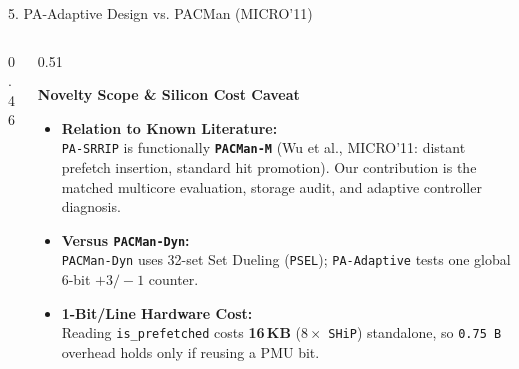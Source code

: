 \documentclass[aspectratio=169, 10pt]{beamer}
\begin{document}
\begin{frame}{5. PA-Adaptive Design vs. PACMan (MICRO'11)}
\begin{columns}[onlytextwidth]
\begin{column}{0.46\textwidth}
\begin{tcolorbox}[cleanpanel, top=1.2mm, bottom=1.2mm, left=1.0mm, right=1.0mm]
{%
        }
      \end{tcolorbox}
    \end{column}%
    \hfill%
    \begin{column}{0.51\textwidth}
      \begin{tcolorbox}[archpanel]
        {\small\textbf{\color{Obsidian}Novelty Scope \& Silicon Cost Caveat}}\par\vspace{0.06cm}
        \begin{itemize}\setlength{\itemsep}{0.16em}\footnotesize
          \item \textbf{Relation to Known Literature:}\\
            \texttt{PA-SRRIP} is functionally \textbf{\texttt{PACMan-M}} (Wu et al., MICRO'11: distant prefetch insertion, standard hit promotion). Our contribution is the matched multicore evaluation, storage audit, and adaptive controller diagnosis.
          \item \textbf{Versus \texttt{PACMan-Dyn}:}\\
            \texttt{PACMan-Dyn} uses 32-set Set Dueling (\texttt{PSEL}); \texttt{PA-Adaptive} tests one global 6-bit $+3/-1$ counter.
          \item \textbf{1-Bit/Line Hardware Cost:}\\
            Reading \texttt{is\_prefetched} costs \textbf{16\,KB} ($8\times$ \texttt{SHiP}) standalone, so \texttt{0.75\,B} overhead holds only if reusing a PMU bit.
        \end{itemize}
      \end{tcolorbox}
    \end{column}
  \end{columns}
\end{frame}
\end{document}

